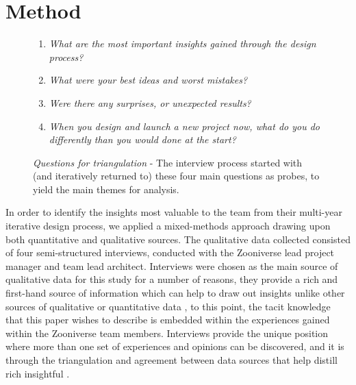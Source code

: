 \documentclass{sigchi}
\begin{document}
\section{Method}

\begin{figure}[tbp]
\begin{center}
\begin{enumerate}[itemsep=2mm]
\item \emph{What are the most important insights gained through the design process?}
\item \emph{What were your best ideas and worst mistakes?}
\item \emph{Were there any surprises, or unexpected results?}
\item \emph{When you design and launch a new project now, what do you do differently than you would done at the start?}
\end{enumerate}
\vspace{10pt}
\caption{\emph{Questions for triangulation} - The interview process started with (and iteratively returned to) these four main questions as probes, to yield the main themes for analysis.}
\label{tbl:questions}
\end{center}
\vspace{-10pt}
\end{figure}

In order to identify the insights most valuable to the team from their multi-year iterative design process, we applied a mixed-methods approach drawing upon both quantitative and qualitative sources. The qualitative data collected consisted of four semi-structured interviews, conducted with the Zooniverse lead project manager and team lead architect. Interviews were chosen as the main source of qualitative data for this study for a number of reasons, they provide a rich and first-hand source of information which can help to draw out insights unlike other sources of qualitative or quantitative data \cite{Yin2003}, to this point, the tacit knowledge that this paper wishes to describe is embedded within the experiences gained within the Zooniverse team members. Interviews provide the unique position where more than one set of experiences and opinions can be discovered, and it is through the triangulation and agreement between data sources that help distill rich insightful \cite{Denzin1978} \cite{Morse1994}. 
\end{document}
